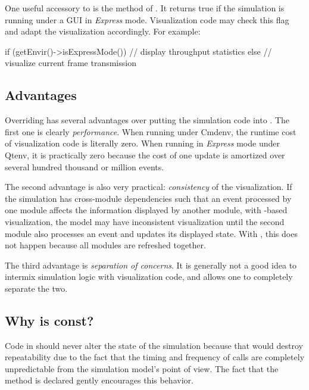 One useful accessory to  is the 
method of . It returns true if the simulation is running under a
GUI in \textit{Express} mode. Visualization code may check this flag and adapt
the visualization accordingly. For example:

\begin{cpp}
if (getEnvir()->isExpressMode()) {
    // display throughput statistics
}
else {
    // visualize current frame transmission
}
\end{cpp}


\subsection{Advantages}
\label{sec:graphics:refreshdisplay-advantages}

Overriding  has several advantages over putting the
simulation code into . The first one is clearly
\textit{performance}. When running under Cmdenv, the runtime cost of
visualization code is literally zero. When running in \textit{Express} mode
under Qtenv, it is practically zero because the cost of one update is amortized
over several hundred thousand or million events.

The second advantage is also very practical: \textit{consistency} of the
visualization. If the simulation has cross-module dependencies such that an
event processed by one module affects the information displayed by another
module, with -based visualization, the model may have
inconsistent visualization until the second module also processes an event and
updates its displayed state. With , this does not happen
because all modules are refreshed together.

The third advantage is \textit{separation of concerns}. It is generally not a
good idea to intermix simulation logic with visualization code, and
 allows one to completely separate the two.

\subsection{Why is  const?}
\label{sec:graphics:refreshdisplay-constness}

Code in  should never alter the state of the simulation
because that would destroy repeatability due to the fact that the timing and
frequency of  calls are completely unpredictable from
the simulation model's point of view. The fact that the method is declared
 gently encourages this behavior.

